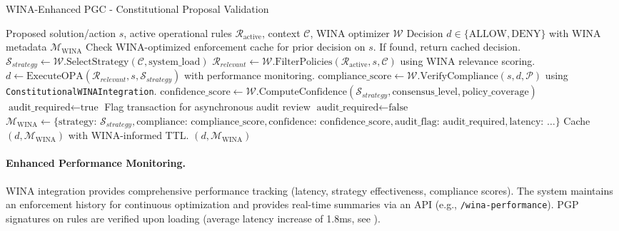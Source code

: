 \documentclass[manuscript,screen,9pt]{acmart}
\begin{document}
\begin{algorithm}[!htbp]
\caption{WINA-Enhanced PGC - Constitutional Proposal Validation}
\label{alg:wina_pgc_validation}
\begin{algorithmic}[1]
\Require Proposed solution/action $s$, active operational rules $\mathcal{R}_{\text{active}}$, context $\mathcal{C}$, WINA optimizer $\mathcal{W}$
\Ensure Decision $d \in \{\text{ALLOW}, \text{DENY}\}$ with WINA metadata $\mathcal{M}_{\text{WINA}}$
    \State Check WINA-optimized enforcement cache for prior decision on $s$. If found, return cached decision.
    \State $\mathcal{S}_{strategy} \gets \mathcal{W}.\text{SelectStrategy}(\mathcal{C}, \text{system\_load})$
    \State $\mathcal{R}_{relevant} \gets \mathcal{W}.\text{FilterPolicies}(\mathcal{R}_{\text{active}}, s, \mathcal{C})$ using WINA relevance scoring.
    \State $d \gets \text{ExecuteOPA}(\mathcal{R}_{relevant}, s, \mathcal{S}_{strategy})$ with performance monitoring.
    \State $\text{compliance\_score} \gets \mathcal{W}.\text{VerifyCompliance}(s, d, \mathcal{P})$ using \texttt{ConstitutionalWINAIntegration}.
    \State $\text{confidence\_score} \gets \mathcal{W}.\text{ComputeConfidence}(\mathcal{S}_{strategy}, \text{consensus\_level}, \text{policy\_coverage})$
        \State $\text{audit\_required} \gets \text{true}$
        \State Flag transaction for asynchronous audit review
    \Else
        \State $\text{audit\_required} \gets \text{false}$
    \EndIf
    \State $\mathcal{M}_{\text{WINA}} \gets \{\text{strategy: } \mathcal{S}_{strategy}, \text{compliance: } \text{compliance\_score}, \text{confidence: } \text{confidence\_score}, \text{audit\_flag: } \text{audit\_required}, \text{latency: } \dots \}$
    \State Cache $(d, \mathcal{M}_{\text{WINA}})$ with WINA-informed TTL.
    \State \Return $(d, \mathcal{M}_{\text{WINA}})$
\EndFunction
\end{algorithmic}
\end{algorithm}

\paragraph{Enhanced Performance Monitoring.} WINA integration provides comprehensive performance tracking (latency, strategy effectiveness, compliance scores). The system maintains an enforcement history for continuous optimization and provides real-time summaries via an API (e.g., \texttt{/wina-performance}). PGP signatures on rules are verified upon loading (average latency increase of 1.8ms, see ).
\end{document}
